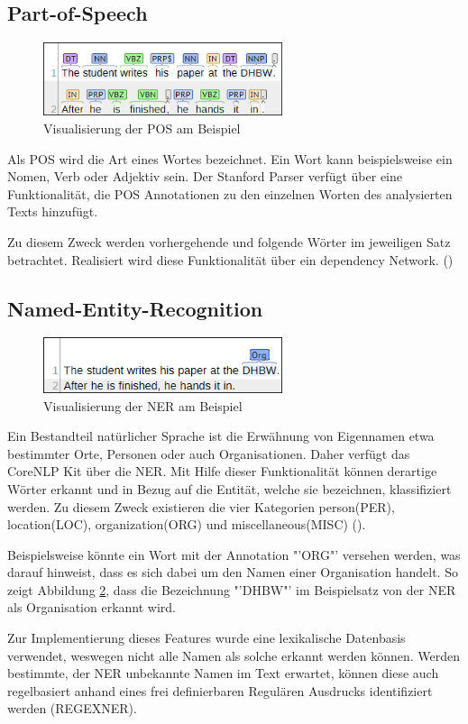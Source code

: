 \subsection{Part-of-Speech}
\begin{figure}
\includegraphics[width=7cm]{pictures/POS.png}
\caption{Visualisierung der POS am Beispiel}
\label{fig:POS}
\end{figure}
Als \ac{POS} wird die Art eines Wortes bezeichnet. Ein Wort kann beispielsweise ein Nomen, Verb oder Adjektiv sein. Der Stanford Parser verfügt über eine Funktionalität, die \ac{POS} Annotationen zu den einzelnen Worten des analysierten Texts hinzufügt.\par
Zu diesem Zweck werden vorhergehende und folgende Wörter im jeweiligen Satz betrachtet. Realisiert wird diese Funktionalität über ein dependency Network. (\cite[vgl.][1]{POSTAGGER})

\subsection{Named-Entity-Recognition}
\begin{figure}
\includegraphics[width=7cm]{pictures/NER.png}
\caption{Visualisierung der NER am Beispiel}
\label{fig:NER}
\end{figure}
Ein Bestandteil natürlicher Sprache ist die Erwähnung von Eigennamen etwa bestimmter Orte, Personen oder auch Organisationen. Daher verfügt das CoreNLP Kit über die \ac{NER}. Mit Hilfe dieser Funktionalität können derartige Wörter erkannt und in Bezug auf die Entität, welche sie bezeichnen,  klassifiziert werden. Zu diesem Zweck existieren die vier Kategorien person(PER), location(LOC), organization(ORG) und miscellaneous(MISC) (\cite[vgl.][4]{STANFORDNER}).\par
Beispielsweise könnte ein Wort mit der Annotation "'ORG"' versehen werden, was darauf hinweist, dass es sich dabei um den Namen einer Organisation handelt. So zeigt Abbildung \ref{fig:NER}, dass die Bezeichnung "'DHBW"' im Beispielsatz von der \ac{NER} als Organisation erkannt wird.\par
Zur Implementierung dieses Features wurde eine lexikalische Datenbasis verwendet, weswegen nicht alle Namen als solche erkannt werden können. Werden bestimmte, der \ac{NER} unbekannte Namen im Text erwartet, können diese auch regelbasiert anhand eines frei definierbaren Regulären Ausdrucks identifiziert werden (REGEXNER).

